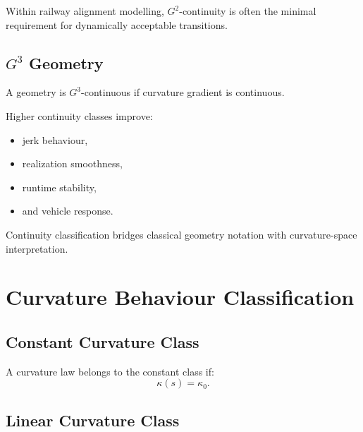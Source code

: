 Within railway alignment modelling, \(G^2\)-continuity is often the
minimal requirement for dynamically acceptable transitions.


\subsection{\texorpdfstring{$G^3$}{G3} Geometry}

\begin{definition}
\label{def:g3-geometry}
A geometry is \(G^3\)-continuous if curvature gradient is continuous.
\end{definition}

Higher continuity classes improve:
\begin{itemize}
\item jerk behaviour,
\item realization smoothness,
\item runtime stability,
\item and vehicle response.
\end{itemize}

Continuity classification bridges classical geometry notation with
curvature-space interpretation.

\section{Curvature Behaviour Classification}

\subsection{Constant Curvature Class}

\begin{definition}
\label{def:constant-curvature-classification}
A curvature law belongs to the constant class if:
\[
\kappa(s)=\kappa_0.
\]
\end{definition}


\subsection{Linear Curvature Class}

